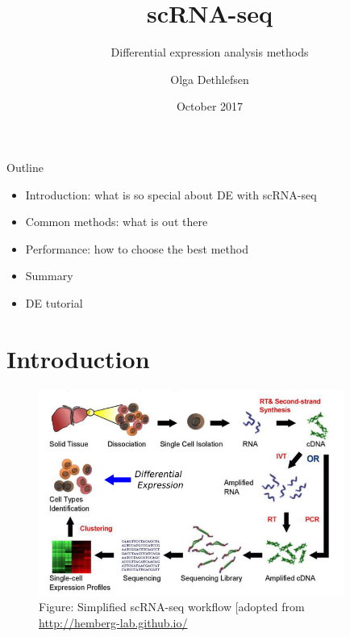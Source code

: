 \documentclass{beamer}\usepackage[]{graphicx}\usepackage[]{color}
\title[scRNA-seq de]{scRNA-seq}
\subtitle{Differential expression analysis methods}
\author[Olga]{Olga Dethlefsen}
\institute[NBIS]{NBIS, National Bioinformatics Infrastructure Sweden\\}
\date[October 2017]{October 2017}
\begin{document}
\begin{frame}
\titlepage
\end{frame}

  
  
\begin{frame}
\begin{block}{Outline}
\begin{itemize}
  \item Introduction: what is so special about DE with scRNA-seq
  \item Common methods: what is out there
  \item Performance: how to choose the best method
  \item Summary
  \item DE tutorial
 \end{itemize}
\end{block}
\end{frame}

\section{Introduction}

\begin{frame}
\begin{center}
\begin{figure}
\includegraphics[width=10cm]{Images/DEoverview.png}
\caption{Figure: Simplified scRNA-seq workflow [adopted from \href{http://hemberg-lab.github.io/]}{http://hemberg-lab.github.io/}}
\end{figure}
\end{center}
\end{frame}
\end{document}
